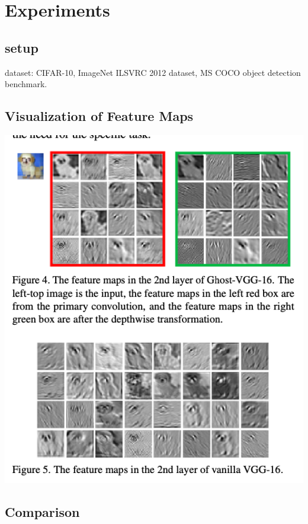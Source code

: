 \documentclass[12pt]{article}
\begin{document}
    \section{
        Experiments
    }
        \subsection{
            setup
        }
            dataset: CIFAR-10, ImageNet ILSVRC 2012 dataset, MS COCO object detection benchmark. \\

        \subsection{
            Visualization of Feature Maps
        }
            \begin{center}
                \includegraphics[scale=0.4]{src/img/FMaps.jpg} \\
            \end{center}
        
        \subsection{
            Comparison
        }
\end{document}
